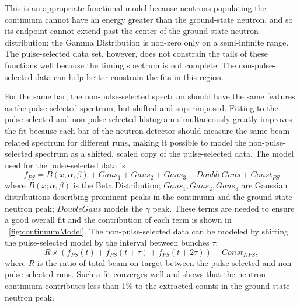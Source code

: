This is an appropriate functional model because neutrons populating the continuum cannot have an energy greater than the ground-state neutron, and so its endpoint cannot extend past the center of the ground state neutron distribution; the Gamma Distribution is non-zero only on a semi-infinite range.  The pulse-selected data set, however, does not constrain the tails of these functions well because the timing spectrum is not complete.  The non-pulse-selected data can help better constrain the fits in this region.

For the same bar, the non-pulse-selected spectrum should have the same features as the pulse-selected spectrum, but shifted and superimposed.  Fitting to the pulse-selected and non-pulse-selected histogram simultaneously greatly improves the fit because each bar of the neutron detector should measure the same beam-related spectrum for different runs, making it possible to model the non-pulse-selected spectrum as a shifted, scaled copy of the pulse-selected data.  The model used for the pulse-selected data is
\begin{equation}
f_{PS} = B(x;\alpha,\beta) + Gaus_1 + Gaus_2 + Gaus_3 + DoubleGaus + Const_{PS}
\end{equation}
where $B(x;\alpha,\beta)$ is the Beta Distribution; $Gaus_1, Gaus_2, Gaus_3$ are Gaussian distributions describing prominent peaks in the continuum and the ground-state neutron peak; $DoubleGaus$ models the $\gamma$ peak.  These terms are needed to ensure a good overall fit and the contribution of each term is shown in {\fig}~\ref{fig:continuumModel}.  The non-pulse-selected data can be modeled by shifting the pulse-selected model by the interval between bunches $\tau$:
\begin{equation}
R\times(f_{PS}(t) + f_{PS}(t+\tau) + f_{PS}(t+2\tau)) + Const_{NPS},
\label{eq:NPS_model}
\end{equation}
where $R$ is the ratio of total beam on target between the pulse-selected and non-pulse-selected runs.  Such a fit converges well and shows that the neutron continuum contributes less than 1\% to the extracted counts in the ground-state neutron peak.  
